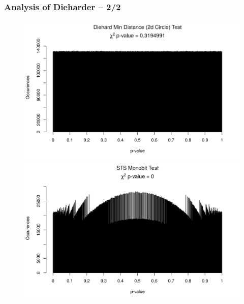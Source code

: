 \documentclass[aspectratio=169]{beamer}
\begin{document}
\begin{frame}
\frametitle{Analysis of Dieharder -- 2/2}

\begin{figure}
\begin{nomar}
\centering
\includegraphics[width=.45\paperwidth]{figures/011.png} 
\includegraphics[width=.45\paperwidth]{figures/100.png}
\end{nomar}
\end{figure}

\end{frame}
\end{document}
